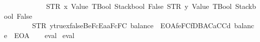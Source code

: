 \begin{isabellebody}
\ \ \ \ \ \ \ \ \ \ \ \ {\isacharbrackleft}{\kern0pt}{\isacharparenleft}{\kern0pt}STR\ {\isacharprime}{\kern0pt}{\isacharprime}{\kern0pt}x{\isacharprime}{\kern0pt}{\isacharprime}{\kern0pt}{\isacharcomma}{\kern0pt}\ {\isacharparenleft}{\kern0pt}Value\ TBool{\isacharcomma}{\kern0pt}\ Stackbool\ False{\isacharparenright}{\kern0pt}{\isacharparenright}{\kern0pt}{\isacharcomma}{\kern0pt}\ {\isacharparenleft}{\kern0pt}STR\ {\isacharprime}{\kern0pt}{\isacharprime}{\kern0pt}y{\isacharprime}{\kern0pt}{\isacharprime}{\kern0pt}{\isacharcomma}{\kern0pt}\ {\isacharparenleft}{\kern0pt}Value\ TBool{\isacharcomma}{\kern0pt}\ Stackbool\ False{\isacharparenright}{\kern0pt}{\isacharparenright}{\kern0pt}{\isacharbrackright}{\kern0pt}\isanewline
\ \ \ \ \ \ \ {\isacharequal}{\kern0pt}\ STR\ {\isacharprime}{\kern0pt}{\isacharprime}{\kern0pt}y{\isacharequal}{\kern0pt}{\isacharequal}{\kern0pt}true{\isasymnewline}x{\isacharequal}{\kern0pt}{\isacharequal}{\kern0pt}false{\isasymnewline}{}{}{}Be{}{}{}{}FcEa{}{}aF{}{}{}{}{}{}{}{}{}c{}{}F{}{}{}{}{}{}C{}{}{}{\isacharcolon}{\kern0pt}\ balance{\isacharequal}{\kern0pt}{\isacharequal}{\kern0pt}{}{}{}\ {\isacharminus}{\kern0pt}\ EOA{\isasymnewline}{}{}{}f{}e{}F{}{}{}{}{}C{}{}f{}DB{}AC{}{}{}{}{}a{}CC{}{}{}{}{}d{}{}{\isacharcolon}{\kern0pt}\ balance{\isacharequal}{\kern0pt}{\isacharequal}{\kern0pt}{}{}{}\ {\isacharminus}{\kern0pt}\ EOA{\isacharprime}{\kern0pt}{\isacharprime}{\kern0pt}{\isachardoublequoteclose}\isanewline
%
\isadelimproof
\ \ %
\endisadelimproof
%
\isatagproof
{}\isamarkupfalse%
\ eval%
\endisatagproof
{\isafoldproof}%
%
\isadelimproof
\isanewline
%
\endisadelimproof
\isanewline
{}\isamarkupfalse%
\ {\isachardoublequoteopen}eval{}\ {}{}{}{}\isanewline

\end{isabellebody}

